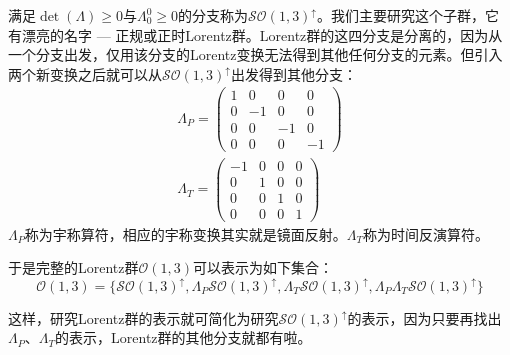 满足$\det(\Lambda) \geq 0$与$\Lambda_0^0 \geq 0$的分支称为$\mathcal{SO}(1, 3)^{\uparrow}$。我们主要研究这个子群，它有漂亮的名字 --- 正规或正时Lorentz群。Lorentz群的这四分支是分离的，因为从一个分支出发，仅用该分支的Lorentz变换无法得到其他任何分支的元素。但引入两个新变换之后就可以从$\mathcal{SO}(1, 3)^\uparrow$出发得到其他分支：
\begin{align}
	\label{equ3.132}
	\Lambda_P =
		\begin{pmatrix}
			1 & 0 & 0 & 0 \\
			0 & -1 & 0 & 0 \\
			0 & 0 & -1 & 0 \\
			0 & 0 & 0 & -1
		\end{pmatrix}
\\
	\label{equ3.133}
	\Lambda_T =
		\begin{pmatrix}
			-1 & 0 & 0 & 0 \\
			0 & 1 & 0 & 0 \\
			0 & 0 & 1 & 0 \\
			0 & 0 & 0 & 1
		\end{pmatrix}
\end{align}
$\Lambda_P$称为宇称算符，相应的宇称变换其实就是镜面反射。$\Lambda_T$称为时间反演算符。

于是完整的Lorentz群$\mathcal{O}(1, 3)$可以表示为如下集合：
\begin{equation}
	\label{equ3.134}
	\mathcal{O}(1, 3) = \{ \mathcal{SO}(1, 3)^\uparrow, \Lambda_P \mathcal{SO}(1, 3)^\uparrow, \Lambda_T \mathcal{SO}(1, 3)^\uparrow, \Lambda_P \Lambda_T \mathcal{SO}(1, 3)^\uparrow \}
\end{equation}

这样，研究Lorentz群的表示就可简化为研究$\mathcal{SO}(1, 3)^\uparrow$的表示，因为只要再找出$\Lambda_P$、$\Lambda_T$的表示，Lorentz群的其他分支就都有啦。

